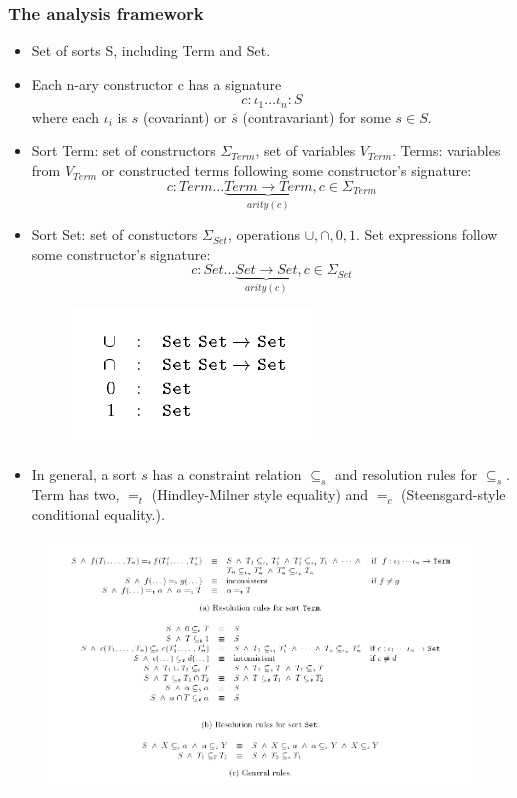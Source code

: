 \documentclass{beamer}
\begin{document}
\begin{frame}[allowframebreaks]
  \frametitle {The analysis framework}
  \begin{itemize}
    \item Set of sorts S, including Term and Set.
    \item Each n-ary constructor c has a signature $$ c: \iota_1
      \dotso \iota_n : S $$
      where each $\iota_i$ is $s$ (covariant) or $\overline{s}$
      (contravariant) for some $s \in S$.
    \item Sort Term: set of constructors $\Sigma_{Term}$, 
      set of variables $V_{Term}$. Terms: variables from $V_{Term}$ or
      constructed terms following some constructor's signature:
      $$ c:Term \dotso \underbrace{Term \rightarrow Term}_{arity(c)},
      c \in \Sigma_{Term} $$
    \item Sort Set: set of constuctors $\Sigma_{Set}$, operations
      ${\cup, \cap, 0, 1}$. Set expressions follow some constructor's
      signature: 
      $$ c:Set \dotso \underbrace{Set \rightarrow Set}_{arity(c)},
      c \in \Sigma_{Set} $$
      \begin{figure}
        \centering
        \includegraphics[scale=0.3]{set_operations.png}
      \end{figure}
    \item In general, a sort $s$ has a constraint relation
      $\subseteq_s$ and resolution rules for $\subseteq_s$. Term has
      two, $=_t$ (Hindley-Milner style equality) and $=_c$
      (Steensgard-style conditional equality.).
  \end{itemize}

  \begin{figure}
    \centering
    \includegraphics[scale=0.3]{resolution_rules.png}
  \end{figure}
\end{frame}
\end{document}
